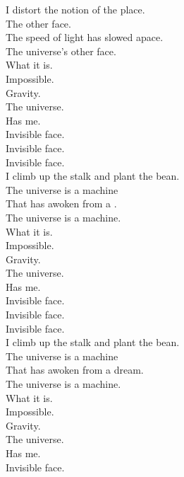 
I distort the notion of the place. \\
The  other face. \\
The speed of light has slowed apace. \\
The universe's other face. \\

What it is. \\
Impossible. \\
Gravity. \\
The universe. \\
Has me. \\
Invisible face. \\
Invisible face. \\
Invisible face. \\

I climb up the stalk and plant the bean. \\
The universe is a machine \\
That has awoken from a . \\
The universe is a machine. \\

What it is. \\
Impossible. \\
Gravity. \\
The universe. \\
Has me. \\
Invisible face. \\
Invisible face. \\
Invisible face. \\

I climb up the stalk and plant the bean. \\
The universe is a machine \\
That has awoken from a dream. \\
The universe is a machine. \\

What it is. \\
Impossible. \\
Gravity. \\
The universe. \\
Has me. \\
Invisible face. \\



